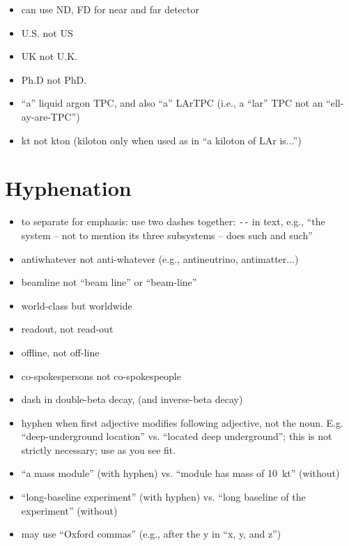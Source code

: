 \begin{itemize}
\item can use ND, FD for near and far detector
\item U.S. not US
\item UK not U.K. 
\item Ph.D not PhD.
\item ``a'' liquid argon TPC, and also ``a'' LArTPC (i.e., a ``lar'' TPC not an ``ell-ay-are-TPC'') 
\item \si{kt} not \si{kton} (kiloton only when used as in ``a kiloton of LAr is...'') 

\end{itemize}

\section{Hyphenation}
\label{sec:english-hyphen}

\begin{itemize}
\item to separate for emphasis: use two dashes together: \verb|--| in text, e.g.,  ``the system -- not to mention its three subsystems -- does such and such'' 
\item antiwhatever not anti-whatever (e.g., antineutrino, antimatter...)
\item beamline not ``beam line'' or ``beam-line'' 
\item world-class but worldwide   
\item readout, not read-out
\item offline, not off-line
\item co-spokespersons not co-spokespeople
\item dash in double-beta decay, (and inverse-beta decay)
\item hyphen when first adjective modifies following adjective, not the noun. E.g. ``deep-underground location'' vs. ``located deep underground'';  this is not strictly necessary; use as you see fit.
\item ``a  mass module'' (with hyphen) vs. ``module has mass of \SI{10}{kt}'' (without)
\item ``long-baseline experiment''  (with hyphen) vs. ``long baseline of the experiment'' (without)
\item may use ``Oxford commas'' (e.g., after the y in ``x, y, and z'')
\end{itemize}

